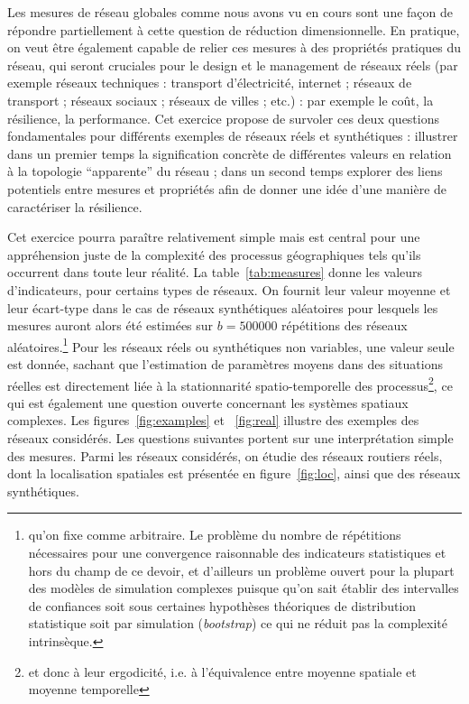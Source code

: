 Les mesures de réseau globales comme nous avons vu en cours sont une façon de répondre partiellement à cette question de réduction dimensionnelle. En pratique, on veut être également capable de relier ces mesures à des propriétés pratiques du réseau, qui seront cruciales pour le design et le management de réseaux réels (par exemple réseaux techniques : transport d'électricité, internet ; réseaux de transport ; réseaux sociaux ; réseaux de villes ; etc.) : par exemple le coût, la résilience, la performance. Cet exercice propose de survoler ces deux questions fondamentales pour différents exemples de réseaux réels et synthétiques : illustrer dans un premier temps la signification concrète de différentes valeurs en relation à la topologie ``apparente'' du réseau ; dans un second temps explorer des liens potentiels entre mesures et propriétés afin de donner une idée d'une manière de caractériser la résilience.

Cet exercice pourra paraître relativement simple mais est central pour une appréhension juste de la complexité des processus géographiques tels qu'ils occurrent dans toute leur réalité. La table~\ref{tab:measures} donne les valeurs d'indicateurs, pour certains types de réseaux. On fournit leur valeur moyenne et leur écart-type dans le cas de réseaux synthétiques aléatoires pour lesquels les mesures auront alors été estimées sur $b=500000$ répétitions des réseaux aléatoires.\footnote{qu'on fixe comme arbitraire. Le problème du nombre de répétitions nécessaires pour une convergence raisonnable des indicateurs statistiques et hors du champ de ce devoir, et d'ailleurs un problème ouvert pour la plupart des modèles de simulation complexes puisque qu'on sait établir des intervalles de confiances soit sous certaines hypothèses théoriques de distribution statistique soit par simulation (\emph{bootstrap}) ce qui ne réduit pas la complexité intrinsèque.} Pour les réseaux réels ou synthétiques non variables, une valeur seule est donnée, sachant que l'estimation de paramètres moyens dans des situations réelles est directement liée à la stationnarité spatio-temporelle des processus\footnote{et donc à leur ergodicité, i.e. à l'équivalence entre moyenne spatiale et moyenne temporelle}, ce qui est également une question ouverte concernant les systèmes spatiaux complexes. Les figures~\ref{fig:examples} et ~\ref{fig:real} illustre des exemples des réseaux considérés. Les questions suivantes portent sur une interprétation simple des mesures. Parmi les réseaux considérés, on étudie des réseaux routiers réels, dont la localisation spatiales est présentée en figure~\ref{fig:loc}, ainsi que des réseaux synthétiques.

